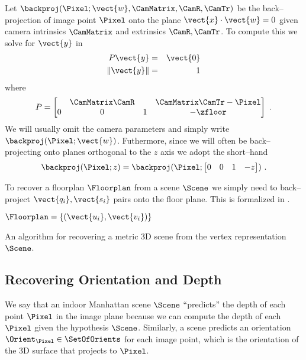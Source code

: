 Let $\backproj(\Pixel;\vect{w},\CamMatrix,\CamR,\CamTr)$ be the
back--projection of image point $\Pixel$ onto the plane
$\vect{x}\cdot\vect{w}=0$ given camera intrinsics $\CamMatrix$ and
extrinsics $\CamR,\CamTr$. To compute this we solve for $\vect{y}$ in
\begin{eqnarray}
  P \vect{y} &=& \vect{0}\\
  \| \vect{y} \| &=& 1
\end{eqnarray}
where
\begin{equation}
  P =
  \begin{bmatrix}
    & \CamMatrix\CamR & & \CamMatrix\CamTr-\Pixel \\
    0 & 0 & 1 & -\zfloor
  \end{bmatrix}~.
\end{equation}
We will usually omit the camera parameters and simply write
$\backproj(\Pixel;\vect{w})$. Futhermore, since we will often be
back--projecting onto planes orthogonal to the $z$ axis we adopt the
short--hand
\begin{equation}
  \backproj(\Pixel;z) = \backproj(\Pixel;
    \begin{bmatrix}0 & 0 & 1 & -z\end{bmatrix}) ~.
\end{equation}

To recover a floorplan $\Floorplan$ from a scene $\Scene$
we simply need to back--project $\vect{q_i},\vect{s_i}$ pairs onto
the floor plane. This is formalized in .

\begin{algorithm}
  \label{alg:scene-to-recon}
      \begin{algorithmic}
        \ENSURE $\Floorplan=\{(\vect{u_i},\vect{v_i})\}$
        \STATE{$\Floorplan \leftarrow \emptyset$}
        \ENDFOR
      \end{algorithmic}
  \caption{An algorithm for recovering a metric 3D scene from the
    vertex representation $\Scene$.}
\end{algorithm}

\subsection{Recovering Orientation and Depth}
We say that an indoor Manhattan scene $\Scene$ ``predicts'' the depth
of each point $\Pixel$ in the image plane because we can compute the
depth of each $\Pixel$ given the hypothesis $\Scene$. Similarly, a
scene predicts an orientation $\Orient_{\Pixel}\in\SetOfOrients$ for
each image point, which is the orientation of the 3D surface that
projects to $\Pixel$.


